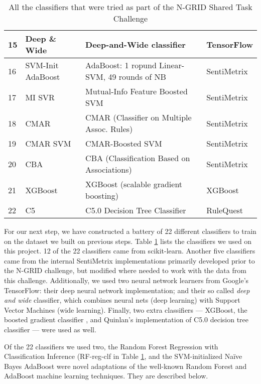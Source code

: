 \begin{table}[t]
\begin{tabular}{|l|l|l|l|}
    15 & \textsf{Deep \& Wide} & \textsf{Deep-and-Wide classifier}& \textsf{TensorFlow} \\
    \hline
    16 & \textsf{SVM-Init AdaBoost}& \textsf{AdaBoost: 1 ropund Linear-SVM,  49 rounds of NB}
    & \textsf{SentiMetrix}\\
    17 &\textsf{MI SVR}&  \textsf{Mutual-Info Feature Boosted SVM} & \textsf{SentiMetrix} \\
    18 & \textsf{CMAR} &  \textsf{CMAR (Classifier on Multiple Assoc. Rules)}& \textsf{SentiMetrix} \\
    19 & \textsf{CMAR SVM}& \textsf{CMAR-Boosted SVM}& \textsf{SentiMetrix} \\
    20 & \textsf{CBA} & \textsf{CBA (Classification Based on Associations)}& \textsf{SentiMetrix} \\
    \hline
    21 & \textsf{XGBoost}& \textsf{XGBoost (scalable gradient boosting)}& \textsf{XGBoost} \\
    22 & \textsf{C5} & \textsf{C5.0 Decision Tree Classifier} & \textsf{RuleQuest} \\
    \hline
    \end{tabular}
    \caption{All the classifiers that were tried as part of the N-GRID Shared Task Challenge}
    \label{tab:Classifiers}
\end{table}


For our next step, we have constructed a battery of 22 different classifiers
to train on the dataset we built on previous steps. 
Table \ref{tab:Classifiers} lists the classifiers we
used on this project. 12 of the 22 classifiers came from \textsf{scikit-learn}.
Another five classifiers came from the internal SentiMetrix implementations
primarily developed prior to the N-GRID challenge, but modified where needed
to work with the data from this challenge.  Additionally, we used two 
neural network learners from Google's \textsf{TensorFlow}: their deep neural network
implementation; and their so called \textit{deep and wide} classifier, which
combines neural nets (deep learning) with Support Vector Machines (wide learning).
Finally, two extra classifiers --- \textsf{XGBoost}, the boosted gradient classifier
\cite{xgboost}, and Quinlan's implementation of
C5.0 decision tree classifier \cite{c5} --- were used as well.

Of the 22 classifiers we used two, the Random Forest Regression with Classification Inference (\textsf{RF-reg-clf} in Table \ref{tab:Classifiers}, and the SVM-initialized
Na\"{i}ve Bayes AdaBoost were novel adaptations of the well-known
Random Forest \cite{breiman01, ho95} and AdaBoost \cite{adaboost} machine learning
techniques. They are described below.

